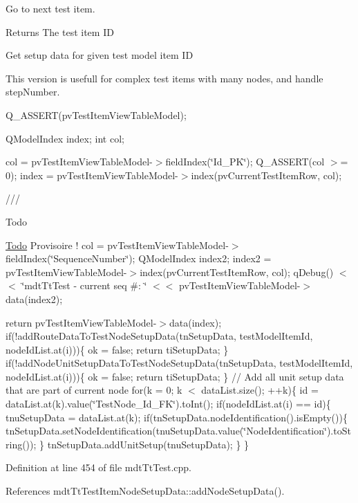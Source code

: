 Go to next test item. 

\begin{DoxyReturn}{Returns}
The test item I\-D
\end{DoxyReturn}
Get setup data for given test model item I\-D

This version is usefull for complex test items with many nodes, and handle step\-Number.

Q\-\_\-\-A\-S\-S\-E\-R\-T(pv\-Test\-Item\-View\-Table\-Model);

Q\-Model\-Index index; int col;

col = pv\-Test\-Item\-View\-Table\-Model-\/$>$field\-Index(\char`\"{}\-Id\-\_\-\-P\-K\char`\"{}); Q\-\_\-\-A\-S\-S\-E\-R\-T(col $>$= 0); index = pv\-Test\-Item\-View\-Table\-Model-\/$>$index(pv\-Current\-Test\-Item\-Row, col);

///\begin{DoxyRefDesc}{Todo}
\item[\hyperlink{todo__todo000082}{Todo}]Provisoire ! col = pv\-Test\-Item\-View\-Table\-Model-\/$>$field\-Index(\char`\"{}\-Sequence\-Number\char`\"{}); Q\-Model\-Index index2; index2 = pv\-Test\-Item\-View\-Table\-Model-\/$>$index(pv\-Current\-Test\-Item\-Row, col); q\-Debug() $<$$<$ \char`\"{}mdt\-Tt\-Test -\/ current seq \#\-: \char`\"{} $<$$<$ pv\-Test\-Item\-View\-Table\-Model-\/$>$data(index2);\end{DoxyRefDesc}


return pv\-Test\-Item\-View\-Table\-Model-\/$>$data(index); if(!add\-Route\-Data\-To\-Test\-Node\-Setup\-Data(tn\-Setup\-Data, test\-Model\-Item\-Id, node\-Id\-List.\-at(i)))\{ ok = false; return ti\-Setup\-Data; \} if(!add\-Node\-Unit\-Setup\-Data\-To\-Test\-Node\-Setup\-Data(tn\-Setup\-Data, test\-Model\-Item\-Id, node\-Id\-List.\-at(i)))\{ ok = false; return ti\-Setup\-Data; \} // Add all unit setup data that are part of current node for(k = 0; k $<$ data\-List.\-size(); ++k)\{ id = data\-List.\-at(k).value(\char`\"{}\-Test\-Node\-\_\-\-Id\-\_\-\-F\-K\char`\"{}).to\-Int(); if(node\-Id\-List.\-at(i) == id)\{ tnu\-Setup\-Data = data\-List.\-at(k); if(tn\-Setup\-Data.\-node\-Identification().is\-Empty())\{ tn\-Setup\-Data.\-set\-Node\-Identification(tnu\-Setup\-Data.\-value(\char`\"{}\-Node\-Identification\char`\"{}).to\-String()); \} tn\-Setup\-Data.\-add\-Unit\-Setup(tnu\-Setup\-Data); \} \} 

Definition at line 454 of file mdt\-Tt\-Test.\-cpp.



References mdt\-Tt\-Test\-Item\-Node\-Setup\-Data\-::add\-Node\-Setup\-Data().


